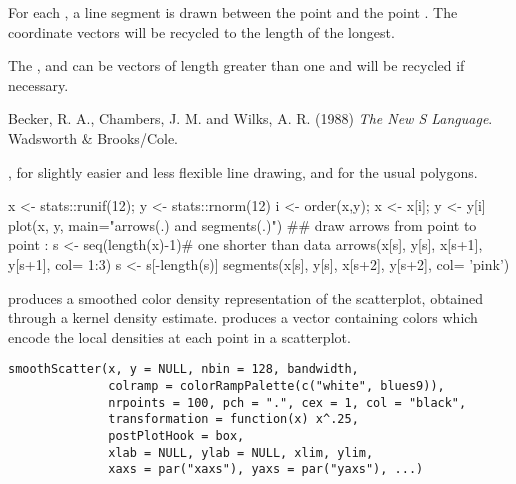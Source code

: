 %
\begin{Details}\relax
For each , a line segment is drawn between the point
 and the point .  The
coordinate vectors will be recycled to the length of the longest.

The  ,  and  can be
vectors of length greater than one and will be recycled if necessary.
\end{Details}
%
\begin{References}\relax
Becker, R. A., Chambers, J. M. and Wilks, A. R. (1988)
\emph{The New S Language}.
Wadsworth \& Brooks/Cole.
\end{References}
%
\begin{SeeAlso}\relax
{}, 
 for slightly easier and less flexible line
drawing, and
 for the usual polygons.
\end{SeeAlso}
%
\begin{Examples}
\begin{ExampleCode}
x <- stats::runif(12); y <- stats::rnorm(12)
i <- order(x,y); x <- x[i]; y <- y[i]
plot(x, y, main="arrows(.) and segments(.)")
## draw arrows from point to point :
s <- seq(length(x)-1)# one shorter than data
arrows(x[s], y[s], x[s+1], y[s+1], col= 1:3)
s <- s[-length(s)]
segments(x[s], y[s], x[s+2], y[s+2], col= 'pink')
\end{ExampleCode}
\end{Examples}
%
\begin{Description}\relax
{} produces a smoothed color density
representation of the scatterplot, obtained through a kernel
density estimate.  produces a vector containing
colors which encode the local densities at each point in a
scatterplot.
\end{Description}
%
\begin{Usage}
\begin{verbatim}
smoothScatter(x, y = NULL, nbin = 128, bandwidth,
              colramp = colorRampPalette(c("white", blues9)),
              nrpoints = 100, pch = ".", cex = 1, col = "black",
              transformation = function(x) x^.25,
              postPlotHook = box,
              xlab = NULL, ylab = NULL, xlim, ylim,
              xaxs = par("xaxs"), yaxs = par("yaxs"), ...)
\end{verbatim}
\end{Usage}
